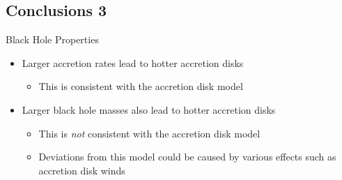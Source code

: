 \documentclass[landscape,9pt]{beamer}
\begin{document}
\subsection{Conclusions 3}
\begin{frame}
	\begin{block}{Black Hole Properties}
	\begin{itemize}
		\item<1> Larger accretion rates lead to hotter accretion disks
		\begin{itemize}
			\item This is consistent with the \citet{Shakura:1973} accretion disk model
		\end{itemize}
		\item<2> Larger black hole masses also lead to hotter accretion disks
		\begin{itemize}
			\item This is {\em not} consistent with the \citet{Shakura:1973} accretion disk model
			\item Deviations from this model could be caused by various effects such as accretion disk winds
		\end{itemize}
	\end{itemize}
	\end{block}
\end{frame}


\appendix
\begin{frame}[allowframebreaks]
		
\end{frame}
\end{document}
